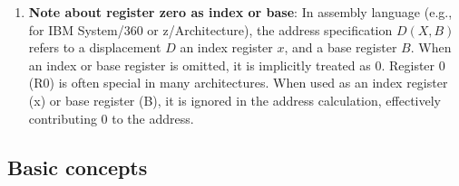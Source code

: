 \documentclass{report}
\begin{document}
\begin{itemize}
\begin{enumerate}
                \item \textbf{Note about register zero as index or base}: In assembly language (e.g., for IBM System/360 or z/Architecture), the address specification $D(X,B)$ refers to a displacement $D$ an index register $x$, and a base register $B$. When an index or base register is omitted, it is implicitly treated as 0.
                    \bigbreak \noindent 
                    Register 0 (R0) is often special in many architectures. When used as an index register (x) or base register (B), it is ignored in the address calculation, effectively contributing 0 to the address.
            \end{enumerate}
        \end{itemize}

            \pagebreak 
            \subsection{Basic concepts}
\end{document}
